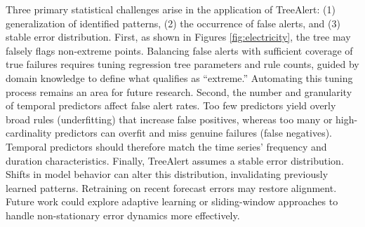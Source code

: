\documentclass[preprint,12pt]{elsarticle}
\begin{document}
Three primary statistical challenges arise in the application of TreeAlert: (1) generalization of identified patterns, (2) the occurrence of false alerts, and (3) stable error distribution. First, as shown in Figures \ref{fig:electricity}, the tree may falsely flags non-extreme points. Balancing false alerts with sufficient coverage of true failures requires tuning regression tree parameters and rule counts, guided by domain knowledge to define what qualifies as “extreme.” Automating this tuning process remains an area for future research. Second, the number and granularity of temporal predictors  affect false alert rates. Too few predictors yield overly broad rules (underfitting) that increase false positives, whereas too many or high-cardinality predictors can overfit and miss genuine failures (false negatives). Temporal predictors should therefore match the time series’ frequency and duration characteristics. Finally, TreeAlert assumes a stable error distribution. Shifts in model behavior can alter this distribution, invalidating previously learned patterns. Retraining on recent forecast errors may restore alignment. Future work could explore adaptive learning or sliding-window approaches to handle non-stationary error dynamics more effectively.
\end{document}
